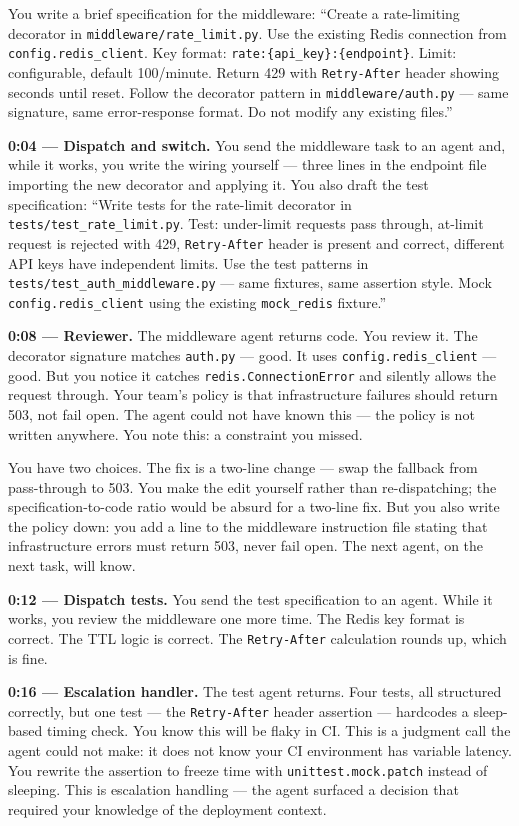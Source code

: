\documentclass[
  a4paper,
  DIV=11,
  numbers=noendperiod]{scrreprt}
\begin{document}
You write a brief specification for the middleware: ``Create a
rate-limiting decorator in \texttt{middleware/rate\_limit.py}. Use the
existing Redis connection from \texttt{config.redis\_client}. Key
format: \texttt{rate:\{api\_key\}:\{endpoint\}}. Limit: configurable,
default 100/minute. Return 429 with \texttt{Retry-After} header showing
seconds until reset. Follow the decorator pattern in
\texttt{middleware/auth.py} --- same signature, same error-response
format. Do not modify any existing files.''

\textbf{0:04 --- Dispatch and switch.} You send the middleware task to
an agent and, while it works, you write the wiring yourself --- three
lines in the endpoint file importing the new decorator and applying it.
You also draft the test specification: ``Write tests for the rate-limit
decorator in \texttt{tests/test\_rate\_limit.py}. Test: under-limit
requests pass through, at-limit request is rejected with 429,
\texttt{Retry-After} header is present and correct, different API keys
have independent limits. Use the test patterns in
\texttt{tests/test\_auth\_middleware.py} --- same fixtures, same
assertion style. Mock \texttt{config.redis\_client} using the existing
\texttt{mock\_redis} fixture.''

\textbf{0:08 --- Reviewer.} The middleware agent returns code. You
review it. The decorator signature matches \texttt{auth.py} --- good. It
uses \texttt{config.redis\_client} --- good. But you notice it catches
\texttt{redis.ConnectionError} and silently allows the request through.
Your team's policy is that infrastructure failures should return 503,
not fail open. The agent could not have known this --- the policy is not
written anywhere. You note this: a constraint you missed.

You have two choices. The fix is a two-line change --- swap the fallback
from pass-through to 503. You make the edit yourself rather than
re-dispatching; the specification-to-code ratio would be absurd for a
two-line fix. But you also write the policy down: you add a line to the
middleware instruction file stating that infrastructure errors must
return 503, never fail open. The next agent, on the next task, will
know.

\textbf{0:12 --- Dispatch tests.} You send the test specification to an
agent. While it works, you review the middleware one more time. The
Redis key format is correct. The TTL logic is correct. The
\texttt{Retry-After} calculation rounds up, which is fine.

\textbf{0:16 --- Escalation handler.} The test agent returns. Four
tests, all structured correctly, but one test --- the
\texttt{Retry-After} header assertion --- hardcodes a sleep-based timing
check. You know this will be flaky in CI. This is a judgment call the
agent could not make: it does not know your CI environment has variable
latency. You rewrite the assertion to freeze time with
\texttt{unittest.mock.patch} instead of sleeping. This is escalation
handling --- the agent surfaced a decision that required your knowledge
of the deployment context.
\end{document}
